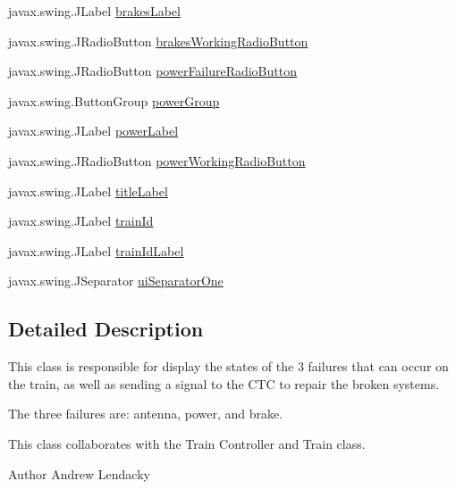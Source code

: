 \begin{DoxyCompactItemize}
\item 
javax.\+swing.\+J\+Label \hyperlink{classTrainControllerComps_1_1TCFailures_ab57a4712aba9bf053d7cbedfaca730e5}{brakes\+Label}
\item 
javax.\+swing.\+J\+Radio\+Button \hyperlink{classTrainControllerComps_1_1TCFailures_a248c5a31df39bfb278e59da0b4641b40}{brakes\+Working\+Radio\+Button}
\item 
javax.\+swing.\+J\+Radio\+Button \hyperlink{classTrainControllerComps_1_1TCFailures_a66d3a69d8c53976528fa025cb0acef2c}{power\+Failure\+Radio\+Button}
\item 
javax.\+swing.\+Button\+Group \hyperlink{classTrainControllerComps_1_1TCFailures_a28320b6b09f3dfb2f7906d24cdc2cb92}{power\+Group}
\item 
javax.\+swing.\+J\+Label \hyperlink{classTrainControllerComps_1_1TCFailures_a567ab26c57cbd96117393bd3ce4958f1}{power\+Label}
\item 
javax.\+swing.\+J\+Radio\+Button \hyperlink{classTrainControllerComps_1_1TCFailures_a1801a3cc7ab2a87605497f7d5fb96acd}{power\+Working\+Radio\+Button}
\item 
javax.\+swing.\+J\+Label \hyperlink{classTrainControllerComps_1_1TCFailures_a58b8932f973472f4199f77e5d2eaaf14}{title\+Label}
\item 
javax.\+swing.\+J\+Label \hyperlink{classTrainControllerComps_1_1TCFailures_ada89c81b5d3fb48652c5f542431dc3da}{train\+Id}
\item 
javax.\+swing.\+J\+Label \hyperlink{classTrainControllerComps_1_1TCFailures_aeee00ebb3eb979b4916d3cf8294c1e59}{train\+Id\+Label}
\item 
javax.\+swing.\+J\+Separator \hyperlink{classTrainControllerComps_1_1TCFailures_addc1377b0e7ab921bba464c9892593e6}{ui\+Separator\+One}
\end{DoxyCompactItemize}


\subsection{Detailed Description}
This class is responsible for display the states of the 3 failures that can occur on the train, as well as sending a signal to the C\+TC to repair the broken systems. 

The three failures are\+: antenna, power, and brake.

This class collaborates with the Train Controller and Train class.

\begin{DoxyAuthor}{Author}
Andrew Lendacky 
\end{DoxyAuthor}


